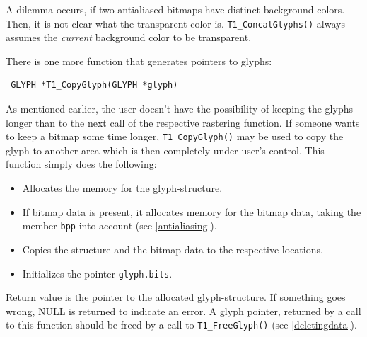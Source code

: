 A dilemma occurs, if two antialiased bitmaps have distinct background
colors. Then, it is not clear what the transparent color
is. \verb+T1_ConcatGlyphs()+ always assumes the {\em current} background color
to be transparent.


There is one more function that generates pointers to glyphs:
\precorr
\begin{verbatim}
 GLYPH *T1_CopyGlyph(GLYPH *glyph)
\end{verbatim}\postcorr
As mentioned earlier, the user doesn't have the possibility of keeping
the  
glyphs longer than to the next call of the respective rastering function. If 
someone wants to keep a bitmap some time longer,  
\verb+T1_CopyGlyph()+ may be used
to copy the glyph to another area which is then completely under user's
control. This function simply does the following:
\begin{itemize}
\item Allocates the memory for the glyph-structure.
\item If bitmap data is present, it allocates memory for the bitmap data,
  taking the member \verb+bpp+ into account (see \ref{antialiasing}).
\item Copies the structure and the bitmap data to the respective locations.
\item Initializes the pointer \verb+glyph.bits+.
\end{itemize}

Return value is the pointer to the allocated glyph-structure. If something
goes wrong, NULL is returned to indicate an error. A glyph pointer,
returned by a call to this function should be freed by a call to
\verb+T1_FreeGlyph()+ (see \ref{deletingdata}).


